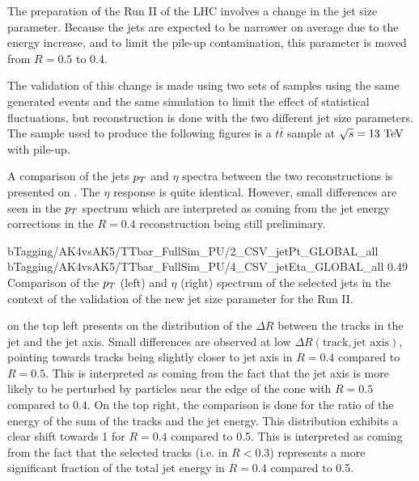     The preparation of the Run II of the LHC involves a change in the jet size parameter.
    Because the jets are expected to be narrower on average due to the energy increase,
    and to limit the pile-up contamination, this parameter is moved from $R = 0.5$ to $0.4$.

    The validation of this change is made using two sets of samples using the same
    generated events and the same simulation to limit the effect of statistical fluctuations,
    but reconstruction is done with the two different jet size parameters. The sample
    used to produce the following figures is a $t\bar{t}$ sample at $\sqrt{s} = 13~\text{TeV}$
    with pile-up.

    A comparison of the jets $p_T$ and $\eta$ spectra between the two reconstructions
    is presented on . The
    $\eta$ response is quite identical. However, small differences are seen in the $p_T$
    spectrum which are interpreted as coming from the jet energy corrections in the
    $R = 0.4$ reconstruction being still preliminary.

                     {bTagging/AK4vsAK5/TTbar_FullSim_PU/2_CSV_jetPt_GLOBAL_all}
                     {bTagging/AK4vsAK5/TTbar_FullSim_PU/4_CSV_jetEta_GLOBAL_all}
                     {0.49}
                     {Comparison of the $p_T$ (left) and $\eta$ (right) spectrum of
                     the selected jets in the context of the validation of the new
                     jet size parameter for the Run II.}

     on the top left
    presents on the distribution of the $\Delta R$ between the tracks in the jet
    and the jet axis. Small differences are observed
    at low $\Delta R(\text{track},\text{jet axis})$, pointing towards tracks being slightly
    closer to jet axis in $R = 0.4$ compared to $R = 0.5$. This is interpreted as coming
    from the fact that the jet axis is more likely to be perturbed by particles near
    the edge of the cone with $R = 0.5$ compared to $0.4$.
    On the top right, the comparison is done for the ratio of the energy of the sum
    of the tracks and the jet energy. This distribution exhibits a clear shift towards
    1 for $R = 0.4$ compared to 0.5. This is interpreted as coming from the fact that
    the selected tracks (i.e. in $R < 0.3$) represents a more significant fraction of
    the total jet energy in $R = 0.4$ compared to 0.5.

